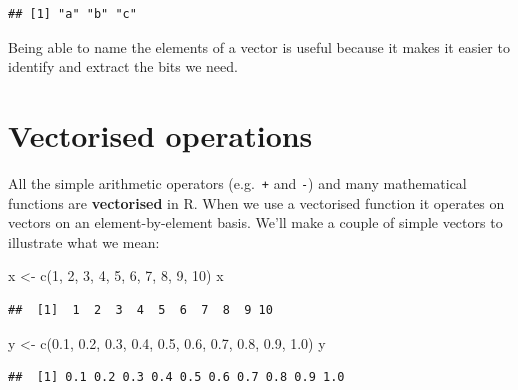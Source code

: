 \documentclass[
]{book}
\newenvironment{Shaded}{\begin{snugshade}}{\end{snugshade}}
\newcommand{\DecValTok}[1]{\textcolor[rgb]{0.00,0.00,0.81}{#1}}
\newcommand{\FloatTok}[1]{\textcolor[rgb]{0.00,0.00,0.81}{#1}}
\newcommand{\FunctionTok}[1]{\textcolor[rgb]{0.00,0.00,0.00}{#1}}
\newcommand{\NormalTok}[1]{#1}
\newcommand{\OtherTok}[1]{\textcolor[rgb]{0.56,0.35,0.01}{#1}}
\begin{document}
\begin{verbatim}
## [1] "a" "b" "c"
\end{verbatim}

Being able to name the elements of a vector is useful because it makes it easier to identify and extract the bits we need.

\hypertarget{vectorised-operations}{%
\section{Vectorised operations}\label{vectorised-operations}}

All the simple arithmetic operators (e.g.~\texttt{+} and \texttt{-}) and many mathematical functions are \textbf{vectorised} in R. When we use a vectorised function it operates on vectors on an element-by-element basis. We'll make a couple of simple vectors to illustrate what we mean:

\begin{Shaded}
\begin{Highlighting}[]
\NormalTok{x }\OtherTok{\textless{}{-}} \FunctionTok{c}\NormalTok{(}\DecValTok{1}\NormalTok{, }\DecValTok{2}\NormalTok{, }\DecValTok{3}\NormalTok{, }\DecValTok{4}\NormalTok{, }\DecValTok{5}\NormalTok{, }\DecValTok{6}\NormalTok{, }\DecValTok{7}\NormalTok{, }\DecValTok{8}\NormalTok{, }\DecValTok{9}\NormalTok{, }\DecValTok{10}\NormalTok{)}
\NormalTok{x}
\end{Highlighting}
\end{Shaded}

\begin{verbatim}
##  [1]  1  2  3  4  5  6  7  8  9 10
\end{verbatim}

\begin{Shaded}
\begin{Highlighting}[]
\NormalTok{y }\OtherTok{\textless{}{-}} \FunctionTok{c}\NormalTok{(}\FloatTok{0.1}\NormalTok{, }\FloatTok{0.2}\NormalTok{, }\FloatTok{0.3}\NormalTok{, }\FloatTok{0.4}\NormalTok{, }\FloatTok{0.5}\NormalTok{, }\FloatTok{0.6}\NormalTok{, }\FloatTok{0.7}\NormalTok{, }\FloatTok{0.8}\NormalTok{, }\FloatTok{0.9}\NormalTok{, }\FloatTok{1.0}\NormalTok{)}
\NormalTok{y}
\end{Highlighting}
\end{Shaded}

\begin{verbatim}
##  [1] 0.1 0.2 0.3 0.4 0.5 0.6 0.7 0.8 0.9 1.0
\end{verbatim}
\end{document}
